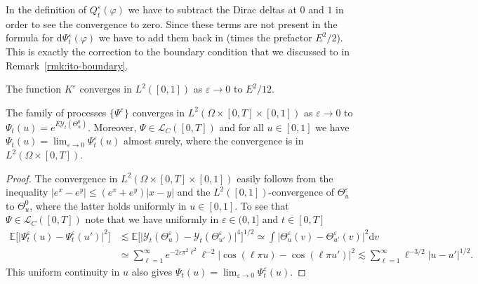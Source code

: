 \documentclass[AHL,Unicode,longabstracts]{cedram}
\newcommand{\bb}[1]{{\mathbb #1}}
\newcommand{\mc}[1]{{\mathcal #1}}
\renewcommand{\mc}[1]{{\mathcal #1}}
\renewcommand{\le}{\leqslant}
\newcommand*{\dd}{\mathrm{d}}
\newcommand*{\dv}{\dd v}
\begin{document}
\begin{rema}\label{rmk:boundary-correction-from-Q}
In the definition of $Q^\varepsilon_t(\varphi)$ we have to subtract the Dirac deltas at $0$ and $1$ in order to see the convergence to zero. Since these terms are not present in the formula for $\dd \Psi^\varepsilon_t(\varphi)$ we have to add them back in (times the prefactor $E^2/2$). This is exactly the correction to the boundary condition that we discussed to in Remark~\ref{rmk:ito-boundary}.
\end{rema}

\begin{lemm}\label{lem:constant-conv}
The function $K^{\varepsilon}$ converges in $L^2 ([0, 1])$ as $\varepsilon \rightarrow 0$ to $E^2 / 12$.
\end{lemm}

\begin{lemm}
The family of processes $\{\Psi^{\varepsilon}\}$ converges in $L^2(\Omega \times [0,T] \times [0,1])$ as $ \varepsilon \to 0$ to $\Psi_t (u) = e^{E \mc Y_t (\Theta^0_u)}$. Moreover, $\Psi \in \mc L_C([0,T])$ and for all $u \in [0,1]$ we have $\Psi_t(u) = \lim_{\varepsilon \to 0} \Psi^\varepsilon_t(u)$ almost surely, where the convergence is in $L^2(\Omega \times [0,T])$.
\end{lemm}

\begin{proof}
The convergence in $L^2(\Omega \times [0,T] \times [0,1])$ easily follows from the inequality $|e^x - e^y| \le (e^x + e^y) |x-y|$ and the $L^2([0,1])$-convergence of $\Theta^\varepsilon_u$ to $\Theta^0_u$, where the latter holds uniformly in $u \in [0,1]$. To see that $\Psi \in \mc L_C([0,T])$ note that we have uniformly in $\varepsilon \in (0,1]$ and $t \in [0,T]$
\begin{align*}
\bb E\Big[\big|\Psi^\varepsilon_t(u) - \Psi^\varepsilon_t(u')\big|^2\Big] & \lesssim \bb E\Big[\big|\mc Y_t (\Theta^\varepsilon_u) - \mc Y_t (\Theta^\varepsilon_{u'})\big|^4\Big]^{1/2} \simeq \int \big|\Theta^\varepsilon_u(v) - \Theta^\varepsilon_{u'}(v)\big|^2 \dv \\
& \simeq \sum_{\ell = 1}^\infty e^{-2\varepsilon \pi^2 \ell^2} \ell^{-2} |\cos(\ell \pi u) - \cos(\ell \pi u')|^2 \lesssim \sum_{\ell = 1}^\infty \ell^{-3/2} |u - u'|^{1/2}.
\end{align*}
This uniform continuity in $u$ also gives $\Psi_t(u) = \lim_{\varepsilon \to 0} \Psi^\varepsilon_t(u)$.
\end{proof}
\end{document}
